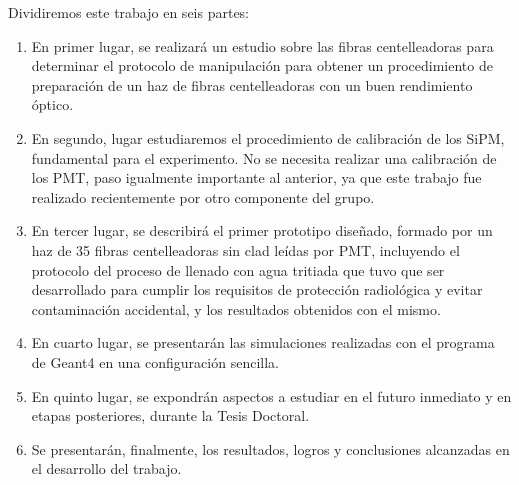 Dividiremos este trabajo en seis partes:
\begin{enumerate}
\item{} En primer lugar, se realizará un estudio sobre las fibras centelleadoras para  determinar  el protocolo de manipulación para obtener un  procedimiento de preparación de  un haz de fibras centelleadoras con un buen rendimiento óptico. 

\item{} En segundo, lugar estudiaremos el procedimiento de calibración de los SiPM,  fundamental para el experimento.  No se necesita realizar una calibración de los PMT, paso igualmente importante al anterior, ya que este trabajo fue realizado recientemente por otro componente del grupo.

\item{} En tercer lugar, se describirá  el primer prototipo diseñado, formado por un haz de 35 fibras centelleadoras sin clad leídas por PMT,  incluyendo el protocolo del proceso de llenado con agua tritiada que tuvo que ser desarrollado para cumplir los requisitos de protección radiológica y evitar contaminación accidental,  y los  resultados obtenidos con el mismo.

\item{} En cuarto lugar, se presentarán las simulaciones realizadas con el programa de Geant4 en una configuración sencilla.

\item{} En quinto lugar, se expondrán aspectos a estudiar en el futuro inmediato y en etapas posteriores, durante la Tesis Doctoral. 


\item{} Se presentarán, finalmente, los resultados, logros y conclusiones alcanzadas en el desarrollo del  trabajo.

\end{enumerate}

